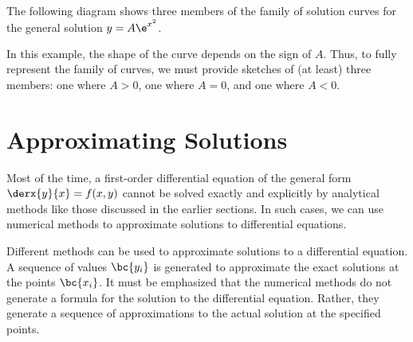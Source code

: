 \begin{example}
    The following diagram shows three members of the family of solution curves for the general solution $y = A\e^{x^2}$.

    \begin{figure}[H]
        \centering
        \caption{}
    \end{figure}

    In this example, the shape of the curve depends on the sign of $A$. Thus, to fully represent the family of curves, we must provide sketches of (at least) three members: one where $A > 0$, one where $A = 0$, and one where $A < 0$.
\end{example}

\section{Approximating Solutions}

Most of the time, a first-order differential equation of the general form $\derx{y}{x} = f(x, y)$ cannot be solved exactly and explicitly by analytical methods like those discussed in the earlier sections. In such cases, we can use numerical methods to approximate solutions to differential equations.

Different methods can be used to approximate solutions to a differential equation. A sequence of values $\bc{y_i}$ is generated to approximate the exact solutions at the points $\bc{x_i}$. It must be emphasized that the numerical methods do not generate a formula for the solution to the differential equation. Rather, they generate a sequence of approximations to the actual solution at the specified points.

